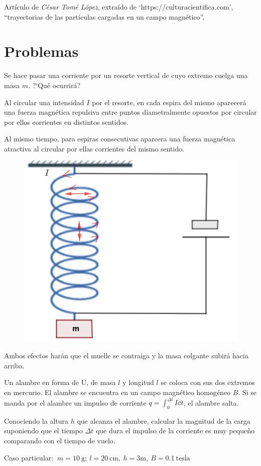 \footnotesize{Artículo de \emph{César Tomé López}, extraído de `https://culturacientifica.com',  ``trayectorias de las partículas cargadas en un campo magnético''}\normalsize{.}

\section{Problemas}
	
\vspace{10mm} %
\begin{prob}
Se hace pasar una corriente por un resorte vertical de cuyo extremo cuelga una masa $m$. ?`Qué ocurrirá?	
\end{prob}

\begin{multicols}{2}
Al circular una intensidad $I$ por el resorte, en cada espira del mismo aparecerá una fuerza magnética repulsiva entre puntos diametralmente opuestos por circular por ellos corrientes en distintos sentidos.

Al mismo tiempo, para espiras consecutivas aparcera una fuerza magnética atractiva al circular por ellas corrientes del mismo sentido.
\begin{figure}[H]
	\centering
	\includegraphics[width=.5\textwidth]{imagenes/imagenes26/T26IM20.png}
	\end{figure}	
\end{multicols}
\vspace{-3mm} Ambos efectos harán que el muelle se contraiga y la masa colgante subirá hacia arriba.


\vspace{10mm} %
\begin{prob}
Un alambre en forma de U, de masa $l$ y longitud $l$ se coloca con sus dos extremos en mercurio. El alambre se encuentra en un campo magnético homogéneo $B$. Si se 	manda por el alambre un impulso de corriente $\displaystyle q=\int_0^{\Delta t} I \dd t$, el alambre salta.

Conociendo la altura $h$ que alcanza el alambre, calcular la magnitud de la carga suponiendo que el tiempo $\Delta t$ que dura el impulso de la corriente es muy pequeño comparando con el tiempo de vuelo.

Caso particular: $\ m=10\ \mathrm{g}; \ l=20 \ \mathrm{cm}, \ h=3 \mathrm{m},\ B=0.1 \ \mathrm{\text{tesla}}$ 
\end{prob}

